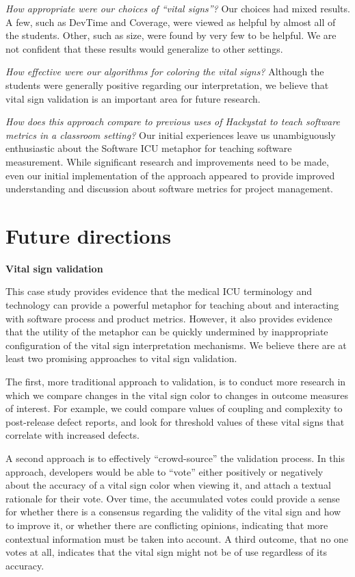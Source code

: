 \documentclass{acm_proc_article-sp}
\begin{document}
{\em How appropriate were our choices of ``vital signs''?} Our choices had mixed results.   A few, such 
as DevTime and Coverage, were viewed as helpful by almost all of the students.  Other, such as 
size, were found by very few to be helpful.   We are not confident that these results would generalize
to other settings.

{\em How effective were our algorithms for coloring the vital signs?} Although the students were generally
positive regarding our interpretation, we believe that vital sign validation is an important area for 
future research. 

{\em How does this approach compare to previous uses of Hackystat to teach
software metrics in a classroom setting?}  Our initial experiences leave us
unambiguously enthusiastic about the Software ICU metaphor for teaching
software measurement. While significant research and improvements need to
be made, even our initial implementation of the approach appeared to
provide improved understanding and discussion about software metrics for
project management.

\section{Future directions}
\label{sec:conclusions}

{\bf Vital sign validation}

This case study provides evidence that the medical ICU terminology and
technology can provide a powerful metaphor for teaching about and
interacting with software process and product metrics.  However, it also
provides evidence that the utility of the metaphor can be quickly
undermined by inappropriate configuration of the vital sign interpretation
mechanisms.  We believe there are at least two promising approaches to
vital sign validation.

The first, more traditional approach to validation, is to conduct more
research in which we compare changes in the vital sign color to changes in
outcome measures of interest.  For example, we could compare values of
coupling and complexity to post-release defect reports, and look for
threshold values of these vital signs that correlate with increased
defects.

A second approach is to effectively ``crowd-source'' the validation
process.  In this approach, developers would be able to ``vote'' either
positively or negatively about the accuracy of a vital sign color when
viewing it, and attach a textual rationale for their vote.  Over time, the
accumulated votes could provide a sense for whether there is a consensus
regarding the validity of the vital sign and how to improve it, or whether
there are conflicting opinions, indicating that more contextual information
must be taken into account.  A third outcome, that no one votes at all,
indicates that the vital sign might not be of use regardless of its
accuracy.
\end{document}
